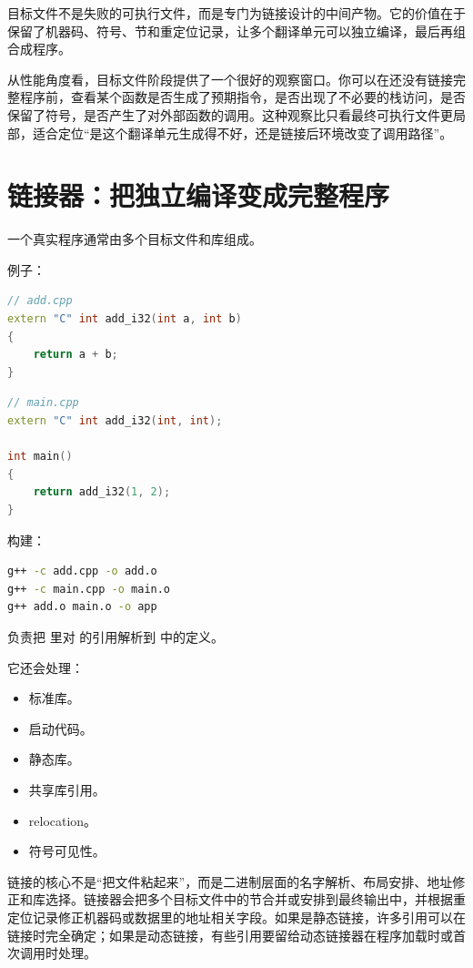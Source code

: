 \begin{keyidea}
目标文件不是失败的可执行文件，而是专门为链接设计的中间产物。它的价值在于保留了机器码、符号、节和重定位记录，让多个翻译单元可以独立编译，最后再组合成程序。
\end{keyidea}

从性能角度看，目标文件阶段提供了一个很好的观察窗口。你可以在还没有链接完整程序前，查看某个函数是否生成了预期指令，是否出现了不必要的栈访问，是否保留了符号，是否产生了对外部函数的调用。这种观察比只看最终可执行文件更局部，适合定位“是这个翻译单元生成得不好，还是链接后环境改变了调用路径”。

\section{链接器：把独立编译变成完整程序}

一个真实程序通常由多个目标文件和库组成。

例子：

\begin{lstlisting}[language=C++]
// add.cpp
extern "C" int add_i32(int a, int b)
{
    return a + b;
}
\end{lstlisting}

\begin{lstlisting}[language=C++]
// main.cpp
extern "C" int add_i32(int, int);

int main()
{
    return add_i32(1, 2);
}
\end{lstlisting}

构建：

\begin{lstlisting}[language=bash]
g++ -c add.cpp -o add.o
g++ -c main.cpp -o main.o
g++ add.o main.o -o app
\end{lstlisting}

 负责把  里对  的引用解析到  中的定义。

它还会处理：

\begin{itemize}
  \item 标准库。
  \item 启动代码。
  \item 静态库。
  \item 共享库引用。
  \item relocation。
  \item 符号可见性。
\end{itemize}

链接的核心不是“把文件粘起来”，而是二进制层面的名字解析、布局安排、地址修正和库选择。链接器会把多个目标文件中的节合并或安排到最终输出中，并根据重定位记录修正机器码或数据里的地址相关字段。如果是静态链接，许多引用可以在链接时完全确定；如果是动态链接，有些引用要留给动态链接器在程序加载时或首次调用时处理。

